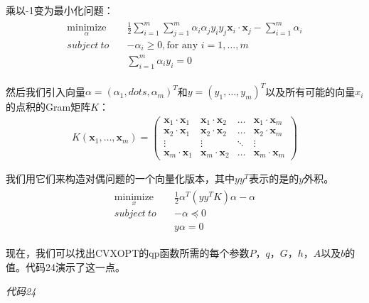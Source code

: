 乘以-1变为最小化问题：
\begin{gather*}
\begin{align*}
\underset{\alpha}{\text{minimize}} \quad & \frac{1}{2}\sum_{i=1}^m\sum_{j=1}^m \alpha_i \alpha_j y_i y_j \mathbf{x}_i \cdot \mathbf{x}_j - \sum_{i=1}^m \alpha_i \\
subject\ to \quad & -\alpha_i \geq 0,\text{for any }i=1,\dots,m \\
& \sum_{i=1}^m \alpha_i y_i = 0
\end{align*}
\end{gather*}

然后我们引入向量$\alpha = (\alpha_1,dots,\alpha_m)^T$和$y = (y_1,\dots,y_m)^T$以及所有可能的向量$x_i$的点积的Gram矩阵$K$：
\begin{gather*}
K(\mathbf{x}_1,\dots,\mathbf{x}_m) = 
\begin{pmatrix}
\mathbf{x}_1 \cdot \mathbf{x}_1 & \mathbf{x}_1 \cdot \mathbf{x}_2 &\dots &\mathbf{x}_1 \cdot \mathbf{x}_m \\
\mathbf{x}_2 \cdot \mathbf{x}_1 & \mathbf{x}_2 \cdot \mathbf{x}_2 &\dots &\mathbf{x}_2 \cdot \mathbf{x}_m \\
\vdots & \vdots & \ddots & \vdots \\
\mathbf{x}_m \cdot \mathbf{x}_1 & \mathbf{x}_m \cdot \mathbf{x}_2 &\dots &\mathbf{x}_m \cdot \mathbf{x}_m 
\end{pmatrix}
\end{gather*}

我们用它们来构造对偶问题的一个向量化版本，其中$yy^T$表示的是的$y$外积。
\begin{gather*}
\begin{align*}
\underset{x}{\text{minimize}} \quad & \frac{1}{2}\alpha^T (yy^TK) \alpha - \alpha \\
subject\ to \quad & -\alpha \preceq 0 \\
& y \alpha = 0
\end{align*}
\end{gather*}

现在，我们可以找出CVXOPT的qp函数所需的每个参数$P，q，G，h，A$以及$b$的值。代码24演示了这一点。

\emph{代码24}

